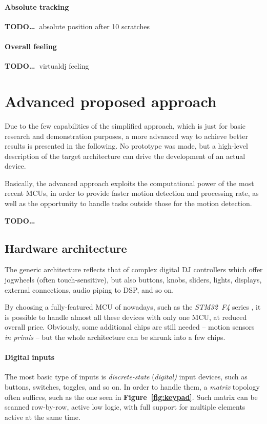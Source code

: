 \documentclass[a4paper,10pt]{article}
\newcommand{\TODO}{\textbf{TODO\dots\ }}
\newcommand{\citef}[1]{\textbf{Figure~\ref{#1}}}
\begin{document}
\begin{multicols}{2}
\paragraph{Absolute tracking}
\TODO absolute position after 10 scratches


\paragraph{Overall feeling}
\TODO virtualdj feeling


\section{Advanced proposed approach}
\label{sec:advanced_approach}

Due to the few capabilities of the simplified approach, which is just for
basic research and demonstration purposes, a more advanced way to achieve
better results is presented in the following. No prototype was made, but a
high-level description of the target architecture can drive the development
of an actual device.

Basically, the advanced approach exploits the computational power of the most
recent MCUs, in order to provide faster motion detection and processing rate,
as well as the opportunity to handle tasks outside those for the motion
detection.

\TODO


\subsection{Hardware architecture}

The generic architecture reflects that of complex digital DJ controllers
which offer jogwheels (often touch-sensitive), but also buttons, knobs,
sliders, lights, displays, external connections, audio piping to DSP, and so
on.

By choosing a fully-featured MCU of nowadays, such as the \emph{STM32~F4}
series \cite{st_stm32f4}, it is possible to handle almost all these devices
with only one MCU, at reduced overall price. Obviously, some additional chips
are still needed -- motion sensors \emph{in primis} -- but the whole
architecture can be shrunk into a few chips.


\paragraph{Digital inputs}
The most basic type of inputs is \emph{discrete-state} (\emph{digital)} input
devices, such as buttons, switches, toggles, and so on. In order to handle
them, a \emph{matrix} topology often suffices, such as the one seen in
\citef{fig:keypad}. Such matrix can be scanned row-by-row, active low logic,
with full support for multiple elements active at the same time.


\end{multicols}
\end{document}
